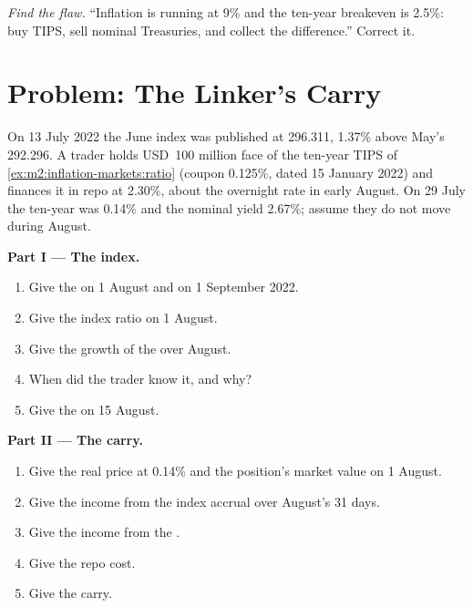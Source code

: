 \begin{exercise}[$\star\star\star$]\label{exo:m2:inflation-markets:8}
\emph{Find the flaw.} ``Inflation is running at 9\% and the ten-year breakeven
is 2.5\%: buy TIPS, sell nominal Treasuries, and collect the difference.''
Correct it.
\end{exercise}

\section{Problem: The Linker's Carry}

\begin{problem}\label{pb:m2:inflation-markets:1}
On 13 July 2022 the June index was published at 296.311, 1.37\% above May's
292.296. A trader holds USD~100 million face of the ten-year TIPS of
\cref{ex:m2:inflation-markets:ratio} (coupon 0.125\%, dated 15 January 2022)
and finances it in repo at 2.30\%, about the overnight rate in early August. On
29 July the ten-year  was 0.14\% and the nominal yield 2.67\%;
assume they do not move during August.

\medskip\noindent\textbf{Part I --- The index.}
\begin{enumerate}
\item Give the  on 1 August and on 1 September 2022.
\item Give the index ratio on 1 August.
\item Give the growth of the  over August.
\item When did the trader know it, and why?
\item Give the  on 15 August.
\end{enumerate}

\medskip\noindent\textbf{Part II --- The carry.}
\begin{enumerate}[resume]
\item Give the real price at 0.14\% and the position's market value on 1 August.
\item Give the income from the index accrual over August's 31 days.
\item Give the income from the .
\item Give the repo cost.
\item Give the carry.
\end{enumerate}


\end{problem}

